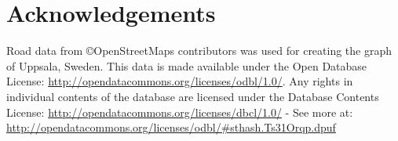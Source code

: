 \section*{Acknowledgements}
\label{sec:acknowledgements}
Road data from \copyright OpenStreetMaps contributors was used for creating the graph of Uppsala, Sweden. This data is made available under the Open Database License: \url{http://opendatacommons.org/licenses/odbl/1.0/}. Any rights in individual contents of the database are licensed under the Database Contents License: \url{http://opendatacommons.org/licenses/dbcl/1.0/} - See more at: \url{http://opendatacommons.org/licenses/odbl/#sthash.Ts31Orqp.dpuf}